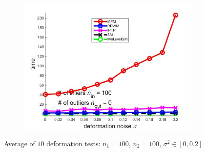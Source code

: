 \documentclass[
	fontsize=12pt,
	paper=a4,
	twoside=false,
	numbers=noenddot,
	plainheadsepline,
	toc=listof,
	toc=bibliography
]{scrartcl}
\begin{document}
\begin{figure}[ht]
\begin{subfigure}[b]{0.3\textwidth}
		\includegraphics[scale=0.25]{"fig_ver2108/syntheticPointSets/deformation_test/time_avg10tests"} 
	\end{subfigure} 	
	\caption{ Average of $10$ deformation tests: $n_1=100$, $n_2=100$, $\sigma^2\in[0, 0.2]$}
\end{figure}

\FloatBarrier	
\end{document}

